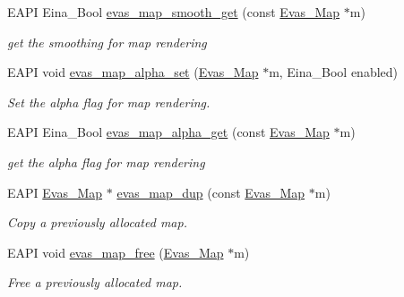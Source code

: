 \begin{DoxyCompactItemize}
EAPI Eina\_\-Bool \hyperlink{Evas_8h_ac7693cff90eddde9f1cd5fd99d6df695}{evas\_\-map\_\-smooth\_\-get} (const \hyperlink{group__Evas__Object__Group__Map_gae94fcea124ae4135e8bb15a014b334dc}{Evas\_\-Map} $\ast$m)
\begin{DoxyCompactList}\small\item\em get the smoothing for map rendering \item\end{DoxyCompactList}\item 
EAPI void \hyperlink{Evas_8h_ae1cbf087e2182e01d07979975baa9065}{evas\_\-map\_\-alpha\_\-set} (\hyperlink{group__Evas__Object__Group__Map_gae94fcea124ae4135e8bb15a014b334dc}{Evas\_\-Map} $\ast$m, Eina\_\-Bool enabled)
\begin{DoxyCompactList}\small\item\em Set the alpha flag for map rendering. \item\end{DoxyCompactList}\item 
EAPI Eina\_\-Bool \hyperlink{Evas_8h_ae7de42394f26fa1e5bfc315f7d114ac3}{evas\_\-map\_\-alpha\_\-get} (const \hyperlink{group__Evas__Object__Group__Map_gae94fcea124ae4135e8bb15a014b334dc}{Evas\_\-Map} $\ast$m)
\begin{DoxyCompactList}\small\item\em get the alpha flag for map rendering \item\end{DoxyCompactList}\item 
EAPI \hyperlink{group__Evas__Object__Group__Map_gae94fcea124ae4135e8bb15a014b334dc}{Evas\_\-Map} $\ast$ \hyperlink{Evas_8h_a25ffe0dd36fed0c9c492d636b163390a}{evas\_\-map\_\-dup} (const \hyperlink{group__Evas__Object__Group__Map_gae94fcea124ae4135e8bb15a014b334dc}{Evas\_\-Map} $\ast$m)
\begin{DoxyCompactList}\small\item\em Copy a previously allocated map. \item\end{DoxyCompactList}\item 
EAPI void \hyperlink{Evas_8h_a78ecdf799f326e1c17aae6770c06058a}{evas\_\-map\_\-free} (\hyperlink{group__Evas__Object__Group__Map_gae94fcea124ae4135e8bb15a014b334dc}{Evas\_\-Map} $\ast$m)
\begin{DoxyCompactList}\small\item\em Free a previously allocated map. \item\end{DoxyCompactList}\item 

\end{DoxyCompactItemize}
